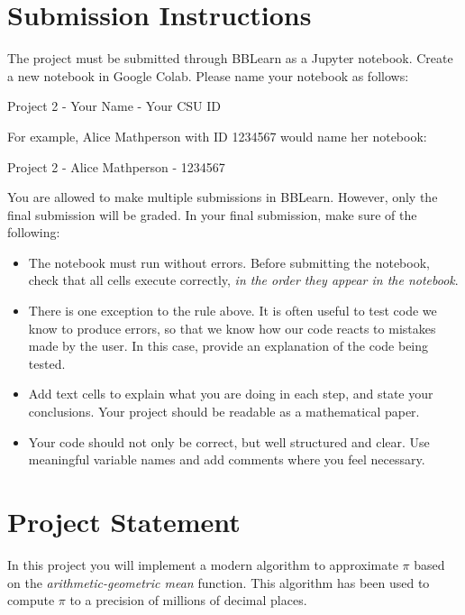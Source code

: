\documentclass[12pt]{article}
\begin{document}
\sffamily

\section{Submission Instructions}
The project must be submitted through BBLearn as a Jupyter notebook. Create a new notebook in Google Colab. Please name your notebook as follows:

\begin{center}
Project 2 - Your Name - Your CSU ID
\end{center}

For example, Alice Mathperson with ID 1234567 would name her notebook:

\begin{center}
Project 2 - Alice Mathperson - 1234567
\end{center}

You are allowed to make multiple submissions in BBLearn. However, only the final submission will be graded. In your final submission, make sure of the following:

\begin{itemize}
\item The notebook must run without errors. Before submitting the notebook, check that all cells execute correctly, \emph{in the order they appear in the notebook}.
\item There is one exception to the rule above. It is often useful to test code we know to produce errors, so that we know how our code reacts to mistakes made by the user. In this case, provide an explanation of the code being tested.
\item Add text cells to explain what you are doing in each step, and state your conclusions. Your project should be readable as a mathematical paper.
\item Your code should not only be correct, but well structured and clear. Use meaningful variable names and add comments where you feel necessary.
\end{itemize}

\section{Project Statement}
In this project you will implement a modern algorithm to approximate $\pi$ based on the \emph{arithmetic-geometric mean} function. This algorithm has been used to compute $\pi$ to a precision of millions of decimal places.
\end{document}
